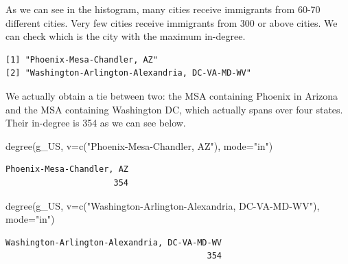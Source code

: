 \documentclass[
  letterpaper,
  DIV=11,
  numbers=noendperiod]{scrreprt}
\newenvironment{Shaded}{\begin{snugshade}}{\end{snugshade}}
\newcommand{\AttributeTok}[1]{\textcolor[rgb]{0.40,0.45,0.13}{#1}}
\newcommand{\FunctionTok}[1]{\textcolor[rgb]{0.28,0.35,0.67}{#1}}
\newcommand{\NormalTok}[1]{\textcolor[rgb]{0.00,0.23,0.31}{#1}}
\newcommand{\SpecialCharTok}[1]{\textcolor[rgb]{0.37,0.37,0.37}{#1}}
\newcommand{\StringTok}[1]{\textcolor[rgb]{0.13,0.47,0.30}{#1}}
\begin{document}
As we can see in the histogram, many cities receive immigrants from
60-70 different cities. Very few cities receive immigrants from 300 or
above cities. We can check which is the city with the maximum in-degree.

\begin{Shaded}
\end{Shaded}

\begin{verbatim}
[1] "Phoenix-Mesa-Chandler, AZ"                   
[2] "Washington-Arlington-Alexandria, DC-VA-MD-WV"
\end{verbatim}

We actually obtain a tie between two: the MSA containing Phoenix in
Arizona and the MSA containing Washington DC, which actually spans over
four states. Their in-degree is 354 as we can see below.

\begin{Shaded}
\begin{Highlighting}[]
\FunctionTok{degree}\NormalTok{(g\_US, }\AttributeTok{v=}\FunctionTok{c}\NormalTok{(}\StringTok{"Phoenix{-}Mesa{-}Chandler, AZ"}\NormalTok{), }\AttributeTok{mode=}\StringTok{"in"}\NormalTok{)}
\end{Highlighting}
\end{Shaded}

\begin{verbatim}
Phoenix-Mesa-Chandler, AZ 
                      354 
\end{verbatim}

\begin{Shaded}
\begin{Highlighting}[]
\FunctionTok{degree}\NormalTok{(g\_US, }\AttributeTok{v=}\FunctionTok{c}\NormalTok{(}\StringTok{"Washington{-}Arlington{-}Alexandria, DC{-}VA{-}MD{-}WV"}\NormalTok{), }\AttributeTok{mode=}\StringTok{"in"}\NormalTok{)}
\end{Highlighting}
\end{Shaded}

\begin{verbatim}
Washington-Arlington-Alexandria, DC-VA-MD-WV 
                                         354 
\end{verbatim}
\end{document}
